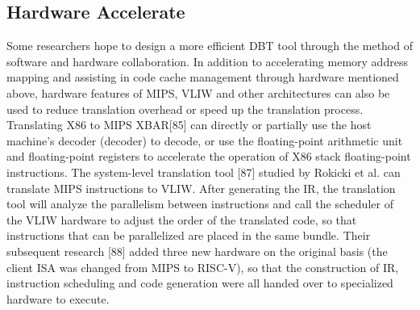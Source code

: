 \subsection{Hardware Accelerate}
Some researchers hope to design a more efficient DBT tool through the method of software and hardware collaboration.
In addition to accelerating memory address mapping and assisting in code cache management through hardware mentioned above, hardware features of MIPS, VLIW and other architectures can also be used to reduce translation overhead or speed up the translation process.
Translating X86 to MIPS XBAR[85] can directly or partially use the host machine's decoder (decoder) to decode, or use the floating-point arithmetic unit and floating-point registers to accelerate the operation of X86 stack floating-point instructions.
The system-level translation tool [87] studied by Rokicki et al. can translate MIPS instructions to VLIW.
After generating the IR, the translation tool will analyze the parallelism between instructions and call the scheduler of the VLIW hardware to adjust the order of the translated code, so that instructions that can be parallelized are placed in the same bundle.
Their subsequent research [88] added three new hardware on the original basis (the client ISA was changed from MIPS to RISC-V), so that the construction of IR, instruction scheduling and code generation were all handed over to specialized hardware to execute.
